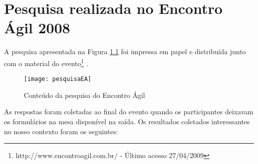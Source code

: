 \chapter{Pesquisa realizada no Encontro Ágil 2008}
\label{ape:EA}

A pesquisa apresentada na Figura \ref{fig:pesquisaEA} foi impressa em
papel e distribuída junto com o material do
evento\footnote{http://www.encontroagil.com.br/ - Último acesso
  27/04/2009} .

\begin{figure}[th]
  \centering
  \texttt{[image: pesquisaEA]}
  \caption{Conteúdo da pesquisa do Encontro Ágil}
  \label{fig:pesquisaEA}
\end{figure}

As respostas foram coletadas ao final do evento quando os
participantes deixavam os formulários na mesa disponível na saída. Os
resultados coletados interessantes no nosso contexto foram os
seguintes:

